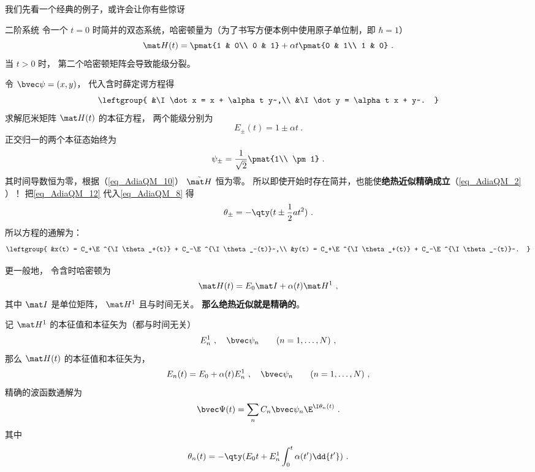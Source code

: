 我们先看一个经典的例子，或许会让你有些惊讶
\begin{example}{二阶系统}
令一个 $t=0$ 时简并的双态系统，哈密顿量为（为了书写方便本例中使用原子单位制，即 $\hbar=1$）
\begin{equation}
\mat H(t) = \pmat{1 & 0\\ 0 & 1}
+ \alpha t \pmat{0 & 1\\ 1 & 0}~.
\end{equation}
当 $t>0$ 时， 第二个哈密顿矩阵会导致能级分裂。

令 $\bvec\psi = (x,y)$， 代入含时薛定谔方程得
\begin{equation}
\leftgroup{
&\I\dot x = x + \alpha t y~,\\
&\I\dot y = \alpha t x + y~.
}\end{equation}
求解厄米矩阵 $\mat H(t)$ 的本征方程， 两个能级分别为
\begin{equation}\label{eq_AdiaQM_12}
E_\pm(t) = 1 \pm \alpha t~.
\end{equation}
正交归一的两个本征态始终为
\begin{equation}
\psi_\pm = \frac{1}{\sqrt{2}}\pmat{1\\ \pm1}~.
\end{equation}
其时间导数恒为零，根据（\autoref{eq_AdiaQM_10}） $\tilde{\mat H}$ 恒为零。 所以即使开始时存在简并，也能使\textbf{绝热近似精确成立}（\autoref{eq_AdiaQM_2} ）！ 把\autoref{eq_AdiaQM_12} 代入\autoref{eq_AdiaQM_8} 得
\begin{equation}
\theta_\pm = -\qty(t \pm \frac{1}{2}at^2)~.
\end{equation}
所以方程的通解为：
\begin{equation}
\leftgroup{
&x(t) = C_+\E^{\I\theta_+(t)} + C_-\E^{\I\theta_-(t)}~,\\
&y(t) = C_+\E^{\I\theta_+(t)} + C_-\E^{\I\theta_-(t)}~.
}\end{equation}
\end{example}

更一般地， 令含时哈密顿为
\begin{equation}
\mat H(t) = E_0\mat I + \alpha(t) \mat H^1~,
\end{equation}
其中 $\mat I$ 是单位矩阵， $\mat H^1$ 且与时间无关。 \textbf{那么绝热近似就是精确的}。

记 $\mat H^1$ 的本征值和本征矢为（都与时间无关）
\begin{equation}
E_n^1~, \quad \bvec\psi_n \qquad (n=1,\dots,N)~,
\end{equation}
那么 $\mat H(t)$ 的本征值和本征矢为，
\begin{equation}
E_n(t) = E_0 + \alpha(t) E_n^1~, \quad \bvec\psi_n \qquad (n=1,\dots,N)~,
\end{equation}
精确的波函数通解为
\begin{equation}
\bvec \Psi(t) = \sum_n C_n \bvec\psi_n \E^{\I\theta_n(t)}~.
\end{equation}
其中
\begin{equation}
\theta_n(t) = -\qty(E_0 t + E_n^1 \int_0^t\alpha(t')\dd{t'})~.
\end{equation}

